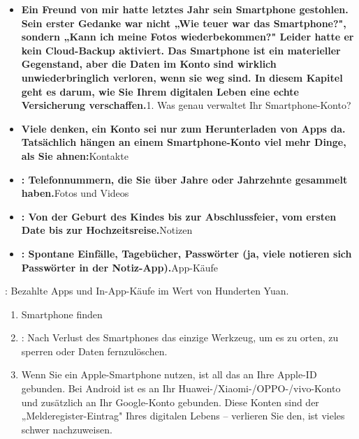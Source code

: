 
\begin{itemize}
  \item \textbf{Ein Freund von mir hatte letztes Jahr sein Smartphone gestohlen. Sein erster Gedanke war nicht „Wie teuer war das Smartphone?", sondern „Kann ich meine Fotos wiederbekommen?" Leider hatte er kein Cloud-Backup aktiviert. Das Smartphone ist ein materieller Gegenstand, aber die Daten im Konto sind wirklich unwiederbringlich verloren, wenn sie weg sind. In diesem Kapitel geht es darum, wie Sie Ihrem digitalen Leben eine echte Versicherung verschaffen.}1. Was genau verwaltet Ihr Smartphone-Konto?
  \item \textbf{Viele denken, ein Konto sei nur zum Herunterladen von Apps da. Tatsächlich hängen an einem Smartphone-Konto viel mehr Dinge, als Sie ahnen:}Kontakte
  \item \textbf{: Telefonnummern, die Sie über Jahre oder Jahrzehnte gesammelt haben.}Fotos und Videos
  \item \textbf{: Von der Geburt des Kindes bis zur Abschlussfeier, vom ersten Date bis zur Hochzeitsreise.}Notizen
  \item \textbf{: Spontane Einfälle, Tagebücher, Passwörter (ja, viele notieren sich Passwörter in der Notiz-App).}App-Käufe
\end{itemize}

\begin{tcbpractice}{: Bezahlte Apps und In-App-Käufe im Wert von Hunderten Yuan.}
\begin{enumerate}
  \item Smartphone finden
  \item : Nach Verlust des Smartphones das einzige Werkzeug, um es zu orten, zu sperren oder Daten fernzulöschen.
  \item Wenn Sie ein Apple-Smartphone nutzen, ist all das an Ihre Apple-ID gebunden. Bei Android ist es an Ihr Huawei-/Xiaomi-/OPPO-/vivo-Konto und zusätzlich an Ihr Google-Konto gebunden. Diese Konten sind der „Melderegister-Eintrag" Ihres digitalen Lebens – verlieren Sie den, ist vieles schwer nachzuweisen.
\end{enumerate}

\end{tcbpractice}
